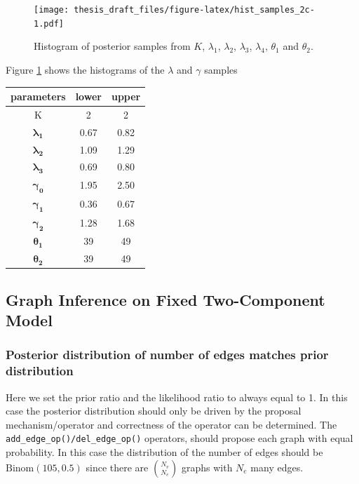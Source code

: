 \documentclass[11pt,a4paper]{article}
\begin{document}
\begin{figure}
\centering
\texttt{[image: thesis\_draft\_files/figure-latex/hist\_samples\_2c-1.pdf]}
\caption{\label{fig:2c_dens} Histogram of posterior samples from \(K\),
\(\lambda_1\), \(\lambda_2\), \(\lambda_3\), \(\lambda_4\), \(\theta_1\)
and \(\theta_2\).}
\end{figure}

Figure \ref{fig:2c_dens} shows the histograms of the \(\lambda\) and
\(\gamma\) samples

\begin{longtable}[]{@{}ccc@{}}
\toprule
parameters & lower & upper\tabularnewline
\midrule
\endhead
K & 2 & 2\tabularnewline
\(\boldsymbol{\lambda_1}\) & 0.67 & 0.82\tabularnewline
\(\boldsymbol{\lambda_2}\) & 1.09 & 1.29\tabularnewline
\(\boldsymbol{\lambda_3}\) & 0.69 & 0.80\tabularnewline
\(\boldsymbol{\gamma_0}\) & 1.95 & 2.50\tabularnewline
\(\boldsymbol{\gamma_1}\) & 0.36 & 0.67\tabularnewline
\(\boldsymbol{\gamma_2}\) & 1.28 & 1.68\tabularnewline
\(\boldsymbol{\theta_1}\) & 39 & 49\tabularnewline
\(\boldsymbol{\theta_2}\) & 39 & 49\tabularnewline
\bottomrule
\end{longtable}

\pagebreak

\hypertarget{graph-inference-on-fixed-two-component-model}{%
\subsection{Graph Inference on Fixed Two-Component
Model}\label{graph-inference-on-fixed-two-component-model}}

\hypertarget{posterior-distribution-of-number-of-edges-matches-prior-distribution}{%
\subsubsection{Posterior distribution of number of edges matches prior
distribution}\label{posterior-distribution-of-number-of-edges-matches-prior-distribution}}

Here we set the prior ratio and the likelihood ratio to always equal to
1. In this case the posterior distribution should only be driven by the
proposal mechanism/operator and correctness of the operator can be
determined. The \texttt{add\_edge\_op()/del\_edge\_op()} operators,
should propose each graph with equal probability. In this case the
distribution of the number of edges should be \(\text{Binom}(105, 0.5)\)
since there are \(\binom{N_v}{N_e}\) graphs with \(N_e\) many edges.
\end{document}
